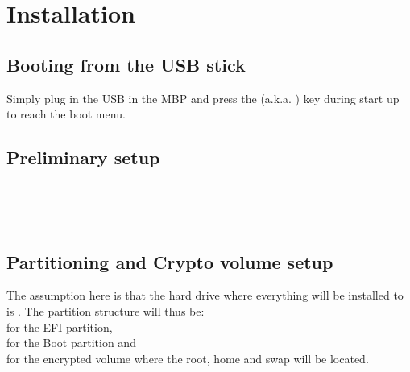 \section{Installation}

\subsection{Booting from the USB stick}

Simply plug in the USB in the MBP and press the  (a.k.a. ) key during start up
to reach the boot menu.

\subsection{Preliminary setup}

\begin{itemize-steps}
	\item {}\\
	\item {}\\
\end{itemize-steps}

\subsection{Partitioning and Crypto volume setup}

The assumption here is that the hard drive where everything will be installed to is . The partition structure will thus be: \\
 for the EFI partition,\\
 for the Boot partition and\\
 for the encrypted volume where the root, home and swap will be located.\\

